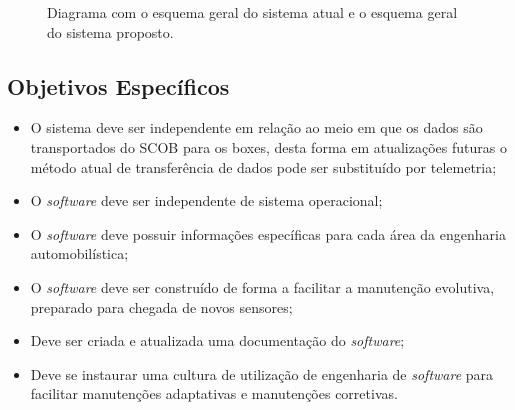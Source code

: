 \begin{figure}[!htb]
	\center
	\caption{Diagrama com o esquema geral do sistema atual e o esquema geral do sistema proposto.}
	\qquad
	\label{fig:esquemageral}
\end{figure}


\subsection{Objetivos Específicos} 

\begin{itemize}[label={-}]
	\item O sistema deve ser independente em relação ao meio em que os dados são transportados do SCOB para os boxes, desta forma em atualizações futuras o método atual de transferência de dados pode ser substituído por telemetria;
	\item O \textit{software} deve ser independente de sistema operacional;
	\item O \textit{software} deve possuir informações específicas para cada área da engenharia automobilística;
	\item O \textit{software} deve ser construído de forma a facilitar a manutenção evolutiva, preparado para chegada de novos sensores;
	\item Deve ser criada e atualizada uma documentação do \textit{software};
	\item Deve se instaurar uma cultura de utilização de engenharia de \textit{software} para facilitar manutenções adaptativas e manutenções corretivas.
\end{itemize}

